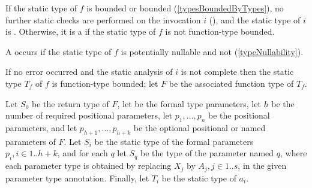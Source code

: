 \documentclass[makeidx]{article}
\begin{document}
{\LMHash{}%
If the static type of $f$ is \DYNAMIC{} bounded or \FUNCTION{} bounded
(\ref{typesBoundedByTypes}),
no further static checks are performed on the invocation $i$
(),
and the static type of $i$ is \DYNAMIC.
Otherwise, it is a  if the static type of $f$ is not
function-type bounded.

\LMHash{}%
A  occurs if the static type of $f$ is potentially nullable
and not \DYNAMIC{}
(\ref{typeNullability}).

\LMHash{}%
If no error occurred and the static analysis of $i$ is not complete
then the static type $T_f$ of $f$ is function-type bounded;
let $F$ be the associated function type of $T_f$.

\LMHash{}%
Let $S_0$ be the return type of $F$,
let \TypeParametersStd{} be the formal type parameters,
let $h$ be the number of required positional parameters,
let $p_1, \ldots, p_n$ be the positional parameters,
and let $p_{h+1}, \ldots, p_{h+k}$ be
the optional positional or named parameters of $F$.
Let $S_i$ be the static type of the formal parameters $p_i, i \in 1 .. h+k$,
and for each $q$ let $S_q$ be the type of the parameter named $q$,
where each parameter type is obtained by replacing $X_j$ by $A_j, j \in 1 .. s$,
in the given parameter type annotation.
Finally, let $T_i$ be the static type of $a_i$.


}
\end{document}
